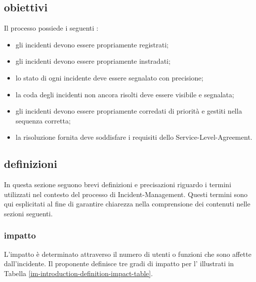 \subsection[Obiettivi]{obiettivi}
\label{im-introduction-objectives}
Il processo possiede i seguenti :

\begin{itemize}
\item{gli incidenti devono essere propriamente registrati;}
\item{gli incidenti devono essere propriamente instradati;}
\item{lo stato di ogni incidente deve essere segnalato con precisione;}
\item{la coda degli incidenti non ancora risolti deve essere visibile e segnalata;}
\item{gli incidenti devono essere propriamente corredati di priorità e gestiti nella sequenza corretta;}
\item{la risoluzione fornita deve soddisfare i requisiti dello \ac{Service-Level-Agreement}.}
\end{itemize}

\subsection[Definizioni]{definizioni}
\label{im-introduction-definitions}
In questa sezione seguono brevi definizioni e precisazioni riguardo i termini utilizzati nel contesto del processo di \ac{Incident-Management}. Questi termini sono qui esplicitati al fine di garantire chiarezza nella comprensione dei contenuti nelle sezioni seguenti.

\subsubsection{impatto}
L'impatto è determinato attraverso il numero di utenti o funzioni che sono affette dall'incidente. Il proponente definisce tre gradi di impatto per l'\entity{} illustrati in Tabella \ref{im-introduction-definition-impact-table}.

